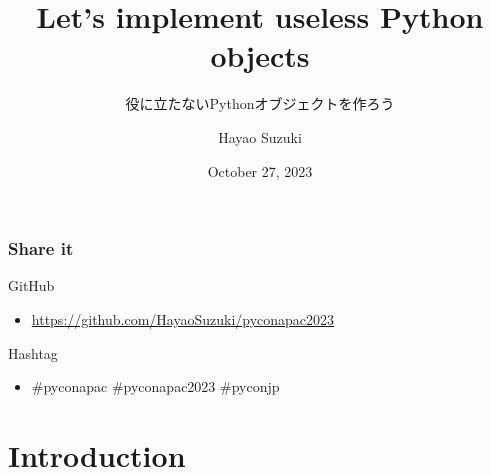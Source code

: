 \documentclass[aspectratio=169,dvipdfmx,12pt,notheorems]{beamer}
\title{Let's implement useless Python objects}
\subtitle{役に立たないPythonオブジェクトを作ろう}
\author[Hayao]{Hayao Suzuki}
\institute[PyCon APAC 2023]{PyCon APAC 2023}
\date{October 27, 2023}
\theoremstyle{definition}
\begin{document}
\begin{frame}[plain]\frametitle{}
\titlepage %
\end{frame}

\begin{frame}\frametitle{Share it}

\begin{block}{GitHub}
\begin{itemize}
\item \url{https://github.com/HayaoSuzuki/pyconapac2023}
\end{itemize}
\end{block}

\begin{block}{Hashtag}
\begin{itemize}
\item \#pyconapac \#pyconapac2023 \#pyconjp
\end{itemize}
\end{block}

\end{frame}

\section{Introduction}
\end{document}

